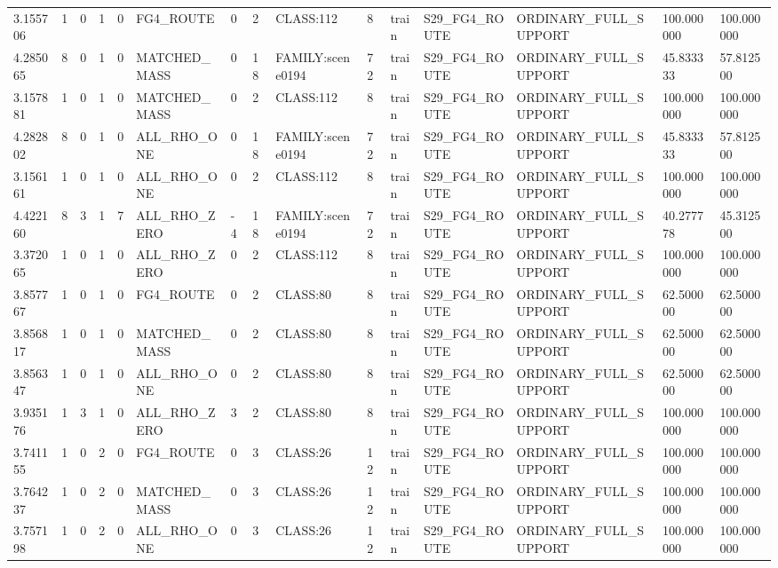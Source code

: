 \begin{tabular}{lllllllllllllll}
3.155706 & 1 & 0 & 1 & 0 & FG4\_ROUTE & 0 & 2 & CLASS:112 & 8 & train & S29\_FG4\_ROUTE & ORDINARY\_FULL\_SUPPORT & 100.000000 & 100.000000 \\
4.285065 & 8 & 0 & 1 & 0 & MATCHED\_MASS & 0 & 18 & FAMILY:scene0194 & 72 & train & S29\_FG4\_ROUTE & ORDINARY\_FULL\_SUPPORT & 45.833333 & 57.812500 \\
3.157881 & 1 & 0 & 1 & 0 & MATCHED\_MASS & 0 & 2 & CLASS:112 & 8 & train & S29\_FG4\_ROUTE & ORDINARY\_FULL\_SUPPORT & 100.000000 & 100.000000 \\
4.282802 & 8 & 0 & 1 & 0 & ALL\_RHO\_ONE & 0 & 18 & FAMILY:scene0194 & 72 & train & S29\_FG4\_ROUTE & ORDINARY\_FULL\_SUPPORT & 45.833333 & 57.812500 \\
3.156161 & 1 & 0 & 1 & 0 & ALL\_RHO\_ONE & 0 & 2 & CLASS:112 & 8 & train & S29\_FG4\_ROUTE & ORDINARY\_FULL\_SUPPORT & 100.000000 & 100.000000 \\
4.422160 & 8 & 3 & 1 & 7 & ALL\_RHO\_ZERO & -4 & 18 & FAMILY:scene0194 & 72 & train & S29\_FG4\_ROUTE & ORDINARY\_FULL\_SUPPORT & 40.277778 & 45.312500 \\
3.372065 & 1 & 0 & 1 & 0 & ALL\_RHO\_ZERO & 0 & 2 & CLASS:112 & 8 & train & S29\_FG4\_ROUTE & ORDINARY\_FULL\_SUPPORT & 100.000000 & 100.000000 \\
3.857767 & 1 & 0 & 1 & 0 & FG4\_ROUTE & 0 & 2 & CLASS:80 & 8 & train & S29\_FG4\_ROUTE & ORDINARY\_FULL\_SUPPORT & 62.500000 & 62.500000 \\
3.856817 & 1 & 0 & 1 & 0 & MATCHED\_MASS & 0 & 2 & CLASS:80 & 8 & train & S29\_FG4\_ROUTE & ORDINARY\_FULL\_SUPPORT & 62.500000 & 62.500000 \\
3.856347 & 1 & 0 & 1 & 0 & ALL\_RHO\_ONE & 0 & 2 & CLASS:80 & 8 & train & S29\_FG4\_ROUTE & ORDINARY\_FULL\_SUPPORT & 62.500000 & 62.500000 \\
3.935176 & 1 & 3 & 1 & 0 & ALL\_RHO\_ZERO & 3 & 2 & CLASS:80 & 8 & train & S29\_FG4\_ROUTE & ORDINARY\_FULL\_SUPPORT & 100.000000 & 100.000000 \\
3.741155 & 1 & 0 & 2 & 0 & FG4\_ROUTE & 0 & 3 & CLASS:26 & 12 & train & S29\_FG4\_ROUTE & ORDINARY\_FULL\_SUPPORT & 100.000000 & 100.000000 \\
3.764237 & 1 & 0 & 2 & 0 & MATCHED\_MASS & 0 & 3 & CLASS:26 & 12 & train & S29\_FG4\_ROUTE & ORDINARY\_FULL\_SUPPORT & 100.000000 & 100.000000 \\
3.757198 & 1 & 0 & 2 & 0 & ALL\_RHO\_ONE & 0 & 3 & CLASS:26 & 12 & train & S29\_FG4\_ROUTE & ORDINARY\_FULL\_SUPPORT & 100.000000 & 100.000000 \\

\end{tabular}
